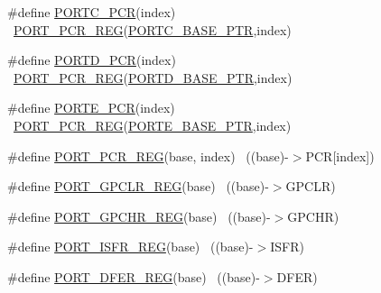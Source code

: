 \begin{DoxyCompactItemize}
\item 
\#define \hyperlink{group___p_o_r_t___register___accessor___macros_ga7eac1367167d119a0388f82fe7f8dd44}{P\+O\+R\+T\+C\+\_\+\+P\+CR}(index)                                              ~\hyperlink{group___p_o_r_t___register___accessor___macros_gac6f8c9eab2e63700616f4d4fa4a6ef0e}{P\+O\+R\+T\+\_\+\+P\+C\+R\+\_\+\+R\+EG}(\hyperlink{group___p_o_r_t___peripheral_ga03c740cdda17711afafc932723871474}{P\+O\+R\+T\+C\+\_\+\+B\+A\+S\+E\+\_\+\+P\+TR},index)
\item 
\#define \hyperlink{group___p_o_r_t___register___accessor___macros_gac2a3e9731320fb291256347dfee6d6c5}{P\+O\+R\+T\+D\+\_\+\+P\+CR}(index)                                              ~\hyperlink{group___p_o_r_t___register___accessor___macros_gac6f8c9eab2e63700616f4d4fa4a6ef0e}{P\+O\+R\+T\+\_\+\+P\+C\+R\+\_\+\+R\+EG}(\hyperlink{group___p_o_r_t___peripheral_ga7f5a263751543810ebfdbde278383276}{P\+O\+R\+T\+D\+\_\+\+B\+A\+S\+E\+\_\+\+P\+TR},index)
\item 
\#define \hyperlink{group___p_o_r_t___register___accessor___macros_ga34d5c13bac091141ec60f381569ea24d}{P\+O\+R\+T\+E\+\_\+\+P\+CR}(index)                                              ~\hyperlink{group___p_o_r_t___register___accessor___macros_gac6f8c9eab2e63700616f4d4fa4a6ef0e}{P\+O\+R\+T\+\_\+\+P\+C\+R\+\_\+\+R\+EG}(\hyperlink{group___p_o_r_t___peripheral_gab166fe285bbb15b52de610f408fe25d3}{P\+O\+R\+T\+E\+\_\+\+B\+A\+S\+E\+\_\+\+P\+TR},index)
\item 
\#define \hyperlink{group___p_o_r_t___register___accessor___macros_gac6f8c9eab2e63700616f4d4fa4a6ef0e}{P\+O\+R\+T\+\_\+\+P\+C\+R\+\_\+\+R\+EG}(base,  index)                              ~((base)-\/$>$P\+CR\mbox{[}index\mbox{]})
\item 
\#define \hyperlink{group___p_o_r_t___register___accessor___macros_gabbf5476f842aa7b313fdd3fedad41ca1}{P\+O\+R\+T\+\_\+\+G\+P\+C\+L\+R\+\_\+\+R\+EG}(base)                                      ~((base)-\/$>$G\+P\+C\+LR)
\item 
\#define \hyperlink{group___p_o_r_t___register___accessor___macros_ga5436d30f4741eacd3c61c337b626ab55}{P\+O\+R\+T\+\_\+\+G\+P\+C\+H\+R\+\_\+\+R\+EG}(base)                                      ~((base)-\/$>$G\+P\+C\+HR)
\item 
\#define \hyperlink{group___p_o_r_t___register___accessor___macros_gace6266e51916939b6ebd7cdb38394c6f}{P\+O\+R\+T\+\_\+\+I\+S\+F\+R\+\_\+\+R\+EG}(base)                                        ~((base)-\/$>$I\+S\+FR)
\item 
\#define \hyperlink{group___p_o_r_t___register___accessor___macros_gaf4400f8add6cb007e24074363387e938}{P\+O\+R\+T\+\_\+\+D\+F\+E\+R\+\_\+\+R\+EG}(base)                                        ~((base)-\/$>$D\+F\+ER)

\end{DoxyCompactItemize}

